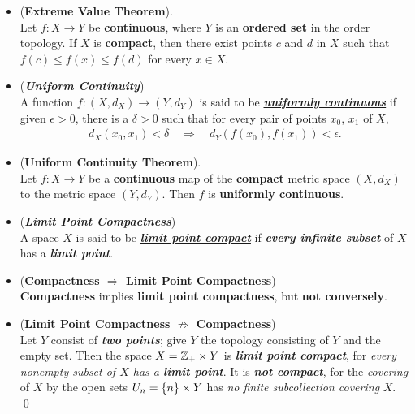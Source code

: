 \documentclass[11pt]{article}
\begin{document}
\begin{itemize}
\item \begin{theorem} (\textbf{Extreme Value Theorem}). \citep{munkres2000topology} \\
Let $f : X \rightarrow Y$ be \textbf{continuous}, where $Y$ is an \textbf{ordered set} in the order topology. If $X$ is \textbf{compact}, then there exist points $c$ and $d$ in $X$ such that $f(c) \le f(x) \le f (d)$ for every $x \in X$.
\end{theorem}


\item \begin{definition} (\emph{\textbf{Uniform Continuity}})\\
A function $f: (X, d_X) \rightarrow (Y, d_Y)$ is said to be \underline{\emph{\textbf{uniformly continuous}}} if given $\epsilon > 0$, there is a $\delta > 0$ such that for every pair of points $x_0$, $x_1$ of $X$,
\begin{align*}
d_X(x_0, x_1) < \delta \quad \Rightarrow \quad d_Y(f(x_0), f(x_1)) < \epsilon. 
\end{align*}
\end{definition}

\item \begin{theorem} (\textbf{Uniform Continuity Theorem}). \citep{munkres2000topology} \\
 Let $f: X \rightarrow Y$ be a \textbf{continuous} map of the \textbf{compact} metric space $(X, d_X) $ to the metric space $(Y, d_Y)$. Then $f$ is \textbf{uniformly continuous}.
\end{theorem}


\item \begin{definition} (\emph{\textbf{Limit Point Compactness}})\\
A space $X$ is said to be \underline{\emph{\textbf{limit point compact}}} if \emph\textbf{{every infinite subset}} of $X$ has a \emph{\textbf{limit point}}.
\end{definition}

\item \begin{proposition}(\textbf{Compactness $\Rightarrow$ Limit Point Compactness}) \citep{munkres2000topology}\\
\textbf{Compactness} implies \textbf{limit point compactness}, but \textbf{not conversely}.
\end{proposition}

\item \begin{example}(\textbf{Limit Point Compactness $\not\Rightarrow$ Compactness}) \\
Let $Y$ consist of \emph{\textbf{two points}}; give $Y$ the topology consisting of $Y$ and the empty set. Then the space $X = {\mathbb Z}_{+} \times Y$ is \textbf{\emph{limit point compact}}, for \emph{every nonempty subset of $X$ has a \textbf{limit point}}. It is \emph{\textbf{not compact}}, for the \emph{covering} of $X$ by the open sets $U_n = \left\{n\right\} \times Y$ has \emph{no finite subcollection covering} $X$. \qed
\end{example}


\end{itemize}
\end{document}
